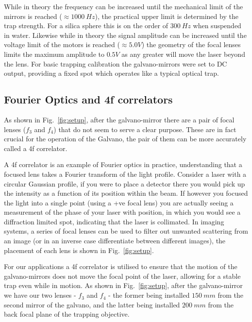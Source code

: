 While in theory the frequency can be increased until the mechanical 
limit of the mirrors is reached ($\approx 1000\ Hz$), the practical 
upper limit is determined by the trap strength. For a silica sphere 
this is on the order of $300\ Hz$ when suspended in water. Likewise 
while in theory the signal amplitude can be increased until the 
voltage limit of the motors is reached ($\approx 5.0 V$) the geometry 
of the focal lenses limits the maximum amplitude to $0.5 V$ as any 
greater will move the laser beyond the lens. For basic trapping 
calibration the galvano-mirrors were set to DC output, providing a 
fixed spot which operates like a typical optical trap. 


\subsection{Fourier Optics and 4f correlators}
\label{sec:4f_correlation}
As shown in Fig.~\ref{fig:setup}, after the galvano-mirror there are a pair
of focal lenses ($f_3$ and $f_4$) that do not seem to serve a clear
purpose. These are in fact crucial for the operation of the Galvano, the
pair of them can be more accurately called a 4f correlator. 

A 4f correlator is an example of Fourier optics in practice, 
understanding that a focused lens takes a Fourier transform 
of the light profile. Consider a laser with a circular Gaussian 
profile, if you were to place a detector there you would pick 
up the intensity as a function of its position within the beam. 
If however you focused the light into a single point (using a 
+ve focal lens) you are actually seeing a measurement of the 
phase of your laser with position, in which you would see a 
diffraction limited spot, indicating that the laser is 
collimated. In imaging systems, a series of focal lenses can be 
used to filter out unwanted scattering from an image (or in an 
inverse case differentiate between different images), the 
placement of each lens is shown in Fig.~\ref{fig:setup}.

For our applications a 4f correlator is utilised to ensure that the 
motion of the galvano-mirrors does not move the focal point of the 
laser, allowing for a stable trap even while in motion. As shown in Fig.~\ref{fig:setup}, after the galvano-mirror we have our two lenses 
- $f_3$ and $f_4$ - the former being installed $150\ mm$ from the 
second mirror of the galvano, and the latter being installed $200\ mm$ 
from the back focal plane of the trapping objective. 

